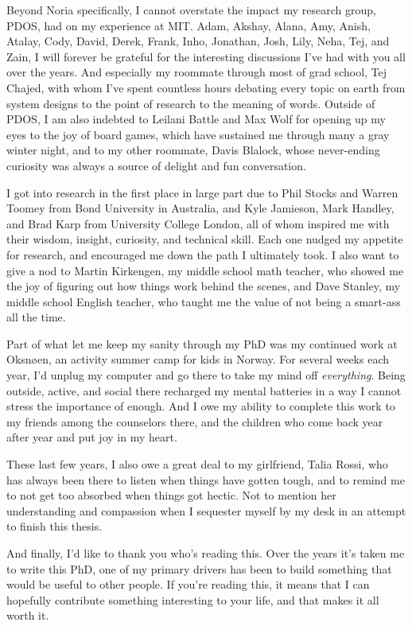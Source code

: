 Beyond Noria specifically, I cannot overstate the impact my research group,
PDOS, had on my experience at MIT. Adam, Akshay, Alana, Amy, Anish, Atalay,
Cody, David, Derek, Frank, Inho, Jonathan, Josh, Lily, Neha, Tej, and Zain, I
will forever be grateful for the interesting discussions I've had with you all
over the years. And especially my roommate through most of grad school, Tej
Chajed, with whom I've spent countless hours debating every topic on earth from
system designs to the point of research to the meaning of words. Outside of
PDOS, I am also indebted to Leilani Battle and Max Wolf for opening up my eyes
to the joy of board games, which have sustained me through many a gray winter
night, and to my other roommate, Davis Blalock, whose never-ending curiosity was
always a source of delight and fun conversation.

I got into research in the first place in large part due to Phil Stocks and
Warren Toomey from Bond University in Australia, and Kyle Jamieson, Mark
Handley, and Brad Karp from University College London, all of whom inspired me
with their wisdom, insight, curiosity, and technical skill. Each one nudged my
appetite for research, and encouraged me down the path I ultimately took. I also
want to give a nod to Martin Kirkengen, my middle school math teacher, who
showed me the joy of figuring out how things work behind the scenes, and Dave
Stanley, my middle school English teacher, who taught me the value of not being
a smart-ass all the time.

Part of what let me keep my sanity through my PhD was my continued work at
Oksnøen, an activity summer camp for kids in Norway. For several weeks each
year, I'd unplug my computer and go there to take my mind off \emph{everything}.
Being outside, active, and social there recharged my mental batteries in a way I
cannot stress the importance of enough. And I owe my ability to complete this
work to my friends among the counselors there, and the children who come back
year after year and put joy in my heart.

These last few years, I also owe a great deal to my girlfriend, Talia Rossi, who
has always been there to listen when things have gotten tough, and to remind me
to not get too absorbed when things got hectic. Not to mention her understanding
and compassion when I sequester myself by my desk in an attempt to finish this
thesis.

And finally, I'd like to thank you who's reading this. Over the years it's taken
me to write this PhD, one of my primary drivers has been to build something that
would be useful to other people. If you're reading this, it means that I can
hopefully contribute something interesting to your life, and that makes it all
worth it.
